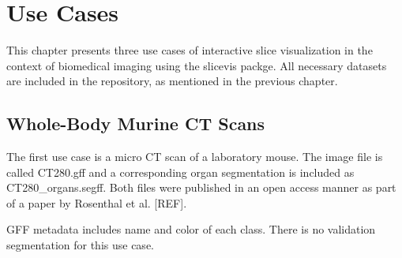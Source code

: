 \chapter{Use Cases}

This chapter presents three use cases of interactive slice visualization in the context of biomedical imaging using the slicevis packge. All necessary datasets are included in the repository, as mentioned in the previous chapter. 

\section{Whole-Body Murine CT Scans}
The first use case is a micro CT scan of a laboratory mouse. The image file is called CT280.gff and a corresponding organ segmentation is included as CT280\_organs.segff. Both files were published in an open access manner as part of a paper by Rosenthal et al. [REF].

GFF metadata includes name and color of each class. There is no validation segmentation for this use case.

